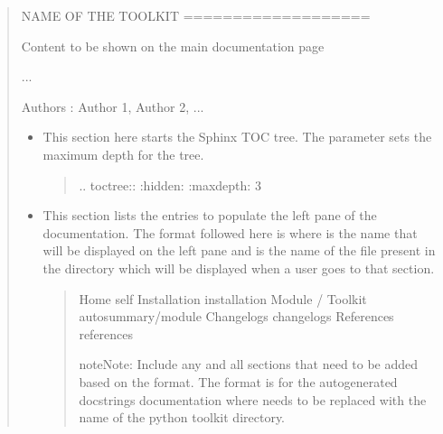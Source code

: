 \documentclass[letterpaper,10pt,english]{sphinxmanual}
\begin{document}
\begin{enumerate}
\begin{quote}
\begin{sphinxVerbatim}[commandchars=\\\{\}]
NAME OF THE TOOLKIT
===================

Content to be shown on the main documentation page

...

Authors : Author 1, Author 2, ...
\end{sphinxVerbatim}
\begin{itemize}
\item {} 
\sphinxAtStartPar
This section here starts the Sphinx TOC tree.
The  parameter sets the maximum depth for the tree.
\begin{quote}

\begin{sphinxVerbatim}[commandchars=\\\{\}]
.. toctree::
    :hidden:
    :maxdepth: 3
\end{sphinxVerbatim}
\end{quote}

\item {} 
\sphinxAtStartPar
This section lists the entries to populate the left pane of the documentation.
The format followed here is  where  is the name that will be displayed on the left pane
and  is the name of the  file present in the  directory which will be displayed when a user goes to that section.
\begin{quote}

\begin{sphinxVerbatim}[commandchars=\\\{\}]
Home \PYGZlt{}self\PYGZgt{}
Installation \PYGZlt{}installation\PYGZgt{}
Module / Toolkit \PYGZlt{}\PYGZus{}autosummary/module\PYGZgt{}
Changelogs \PYGZlt{}changelogs\PYGZgt{}
References \PYGZlt{}references\PYGZgt{}
\end{sphinxVerbatim}

\begin{sphinxadmonition}{note}{Note:}
\sphinxAtStartPar
Include any and all sections that need to be added based on the format.
The  format is for the autogenerated docstrings documentation where  needs to be replaced with the name of the python toolkit directory.
\end{sphinxadmonition}
\end{quote}


\end{itemize}
\end{quote}
\end{enumerate}
\end{document}

